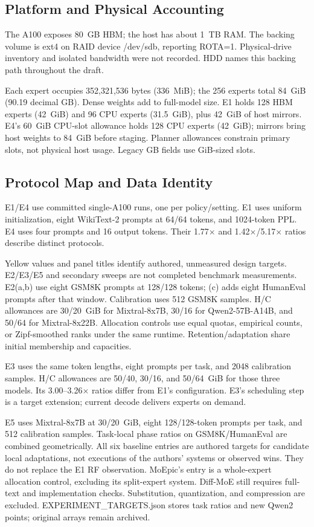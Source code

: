 \subsection{Platform and Physical Accounting}
The A100 exposes 80~GB HBM; the host has about 1~TB RAM. The backing volume is ext4 on RAID device /dev/sdb, reporting ROTA=1. Physical-drive inventory and isolated bandwidth were not recorded. HDD names this backing path throughout the draft.

Each expert occupies 352,321,536 bytes (336~MiB); the 256 experts total 84~GiB (90.19 decimal GB). Dense weights add to full-model size. E1 holds 128 HBM experts (42~GiB) and 96 CPU experts (31.5~GiB), plus 42~GiB of host mirrors. E4's 60~GiB CPU-slot allowance holds 128 CPU experts (42~GiB); mirrors bring host weights to 84~GiB before staging. Planner allowances constrain primary slots, not physical host usage. Legacy GB fields use GiB-sized slots.

\subsection{Protocol Map and Data Identity}
E1/E4 use committed single-A100 runs, one per policy/setting. E1 uses uniform initialization, eight WikiText-2 prompts at 64/64 tokens, and 1024-token PPL. E4 uses four prompts and 16 output tokens. Their 1.77$\times$ and 1.42$\times$/5.17$\times$ ratios describe distinct protocols.

Yellow values and panel titles identify authored, unmeasured design targets. E2/E3/E5 and secondary sweeps are not completed benchmark measurements. E2(a,b) use eight GSM8K prompts at 128/128 tokens; (c) adds eight HumanEval prompts after that window. Calibration uses 512 GSM8K samples. H/C allowances are 30/20~GiB for Mixtral-8x7B, 30/16 for Qwen2-57B-A14B, and 50/64 for Mixtral-8x22B. Allocation controls use equal quotas, empirical counts, or Zipf-smoothed ranks under the same runtime. Retention/adaptation share initial membership and capacities.

E3 uses the same token lengths, eight prompts per task, and 2048 calibration samples. H/C allowances are 50/40, 30/16, and 50/64~GiB for those three models. Its 3.00--3.26$\times$ ratios differ from E1's configuration. E3's scheduling step is a target extension; current decode delivers experts on demand.

E5 uses Mixtral-8x7B at 30/20~GiB, eight 128/128-token prompts per task, and 512 calibration samples. Task-local phase ratios on GSM8K/HumanEval are combined geometrically. All six baseline entries are authored targets for candidate local adaptations, not executions of the authors' systems or observed wins. They do not replace the E1 RF observation. MoEpic's entry is a whole-expert allocation control, excluding its split-expert system. Diff-MoE still requires full-text and implementation checks. Substitution, quantization, and compression are excluded. EXPERIMENT\_TARGETS.json stores task ratios and new Qwen2 points; original arrays remain archived.

